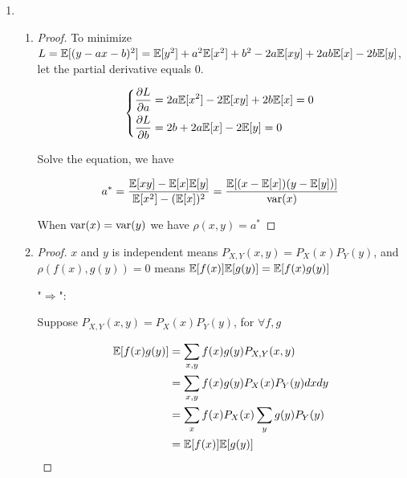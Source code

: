 \documentclass[a4paper]{article}
\begin{document}
\begin{enumerate}
\begin{enumerate}
\begin{enumerate}
\begin{proof}
        So $\det (\Sigma) = 0$
    \end{proof}
    \end{enumerate}
    \end{enumerate}

  \item \begin{enumerate}
    \item \begin{proof}
      To minimize $L = \mathbb{E}[(y-ax-b)^2] = \mathbb{E}[y^2] +a^2 \mathbb{E}[x^2] +b^2 - 2a\mathbb{E}[xy] +2ab\mathbb{E}[x] -2b \mathbb{E}[y]$, let the partial derivative equals 0.

      \begin{equation}
      \left\{
      \begin{aligned}
          \frac{\partial L }{\partial a}  &= 2a \mathbb{E}[x^2] -2\mathbb{E}[xy]+2b\mathbb{E}[x] = 0  \\ \frac{\partial L }{\partial b}  &= 2b +2a\mathbb{E}[x]-2\mathbb{E}[y]=0 
      \end{aligned}
      \right.
      \end{equation}

      Solve the equation, we have 

      \begin{equation}
        a^* = \frac{\mathbb{E}[xy]-\mathbb{E}[x]\mathbb{E}[y]}{\mathbb{E}[x^2]-(\mathbb{E}[x])^2} = \frac {\mathbb{E}[(x-\mathbb{E}[x])(y-\mathbb{E}[y])]}{\operatorname{var}(x)}
      \end{equation}

      When $\operatorname{var}(x) = \operatorname{var}(y)$ we have $\rho(x,y) = a^*$ 
    \end{proof}

    \item \begin{proof}
      $x$ and $y$ is independent means $ P_{X,Y}(x,y) = P_{X}(x) P_{Y}(y)$, and $\rho(f(x),g(y)) = 0$ means $\mathbb{E}[f(x)] \mathbb{E}[g(y)] = \mathbb{E}[f(x)g(y)]$

      "$\Longrightarrow$": 

      Suppose $ P_{X,Y}(x,y) = P_{X}(x) P_{Y}(y)$, for $\forall f,g$

      \begin{equation}
        \begin{aligned}
          \mathbb{E} [f(x)g(y)] & = \sum_{x,y} f(x)g(y) P_{X,Y}(x,y)  \\
          & = \sum_{x,y} f(x)g(y)  P_{X}(x) P_{Y}(y)dxdy \\ 
          & = \sum_{x} f(x) P_{X}(x)  \sum_{y} g(y) P_{Y}(y)  \\ 
          & = \mathbb{E}[f(x)] \mathbb{E}[g(y)]
        \end{aligned}
      \end{equation}


\end{proof}
\end{enumerate}
\end{enumerate}
\end{document}
